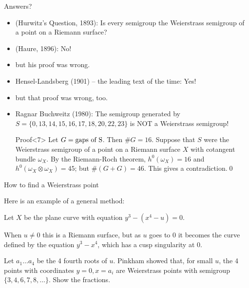 \documentclass[12pt, aspectratio=169]{beamer}
\begin{document}
\begin{frame}{Answers?}
 
\begin{itemize}
 \item<1-6> (Hurwitz's Question, 1893):\alert{ Is every semigroup the Weierstrass semigroup of a point
on a Riemann surface?}
\item <2-> \qquad (Haure, 1896): No!
\item<3-> \qquad\qquad but his proof was wrong.
\item<4-> \qquad Hensel-Landsberg (1901) -- the leading text of the time: Yes!
\item<5-> \qquad\qquad but that proof was wrong, too.
\item<6-> \qquad \alert{Ragnar Buchweitz} (1980): The semigroup generated by
$S = \{0, 13, 14, 15, 16, 17, 18, 20, 22, 23\} $ is NOT a Weierstrass semigroup! 
\smallskip

\begin{block}{Proof}<7>
 Let $G= \hbox{gaps of S}$. Then $\#G = 16$. Suppose that $S$ were the Weierstrass semigroup
of a point on a Riemann surface $X$ with cotangent bundle $\omega_X$. By the Riemann-Roch theorem,
$h^0(\omega_X) = 16$ and $h^0(\omega_X\otimes \omega_X) = 45$; but $\#(G+G) = 46$. This gives a  contradiction.\qed
\end{block}

\end{itemize}
\end{frame}

\begin{frame}{How to find a Weierstrass point}

Here is an example of a general method:

\begin{example}[Pinkham, 1974]
Let $X$ be the plane curve with equation $y^3-(x^4 -u) = 0.$
\begin{figure}
 
\end{figure} 

When $u\neq 0$ this is a Riemann surface, but as $u$ goes to 0 it becomes the curve 
defined by the equation $y^3-x^4$, which has a cusp singularity at 0.
\begin{figure}
 
\end{figure}
Let $a_{1}\dots a_{4}$ be the 4 fourth roots of $u$.
Pinkham showed that, for small $u$, the
4 points with coordinates $y=0, x=a_{i}$ are Weierstrass points with 
semigroup $\{3,4,6,7,8,\dots\}$.
\alert{Show the fractions}.
\end{example}
\end{frame}
\end{document}
